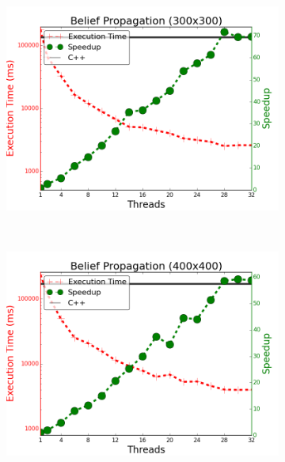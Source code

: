 \begin{figure}[]
        \centering
        \begin{subfigure}[b]{\plotsize\textwidth}
                \includegraphics[width=\textwidth]{experiments/scalability/scale-belief-propagation-300.png}
                \label{fig:implementation:scale_bp300}
        \end{subfigure}
        ~
        \begin{subfigure}[b]{\plotsize\textwidth}
                \includegraphics[width=\textwidth]{experiments/scalability/scale-belief-propagation-400.png}
                \label{fig:implementation:scale_bp400}
        \end{subfigure}\\
        \label{fig:implementation:scale_bp}
\end{figure}

